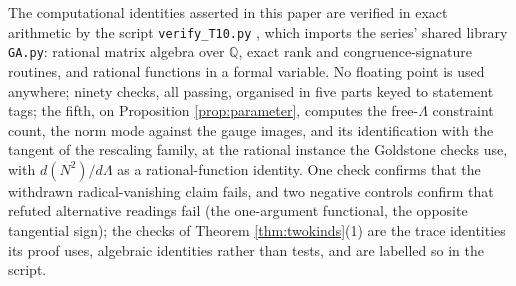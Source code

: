 \documentclass[11pt]{article}
\theoremstyle{definition}
\begin{document}
The computational identities asserted in this paper are verified in exact arithmetic by the script \texttt{verify\_T10.py} \cite{ButlerVerifyT10}, which imports the series' shared library \texttt{GA.py}: rational matrix algebra over $\mathbb{Q}$, exact rank and congruence-signature routines, and rational functions in a formal variable. No floating point is used anywhere; ninety checks, all passing, organised in five parts keyed to statement tags; the fifth, on Proposition \ref{prop:parameter}, computes the free-$\Lambda$ constraint count, the norm mode against the gauge images, and its identification with the tangent of the rescaling family, at the rational instance the Goldstone checks use, with $d(N^2)/d\Lambda$ as a rational-function identity. One check confirms that the withdrawn radical-vanishing claim fails, and two negative controls confirm that refuted alternative readings fail (the one-argument functional, the opposite tangential sign); the checks of Theorem \ref{thm:twokinds}(1) are the trace identities its proof uses, algebraic identities rather than tests, and are labelled so in the script.
\end{document}
